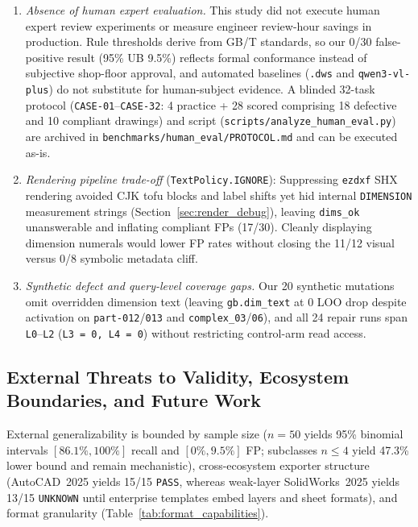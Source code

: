 \documentclass[nocopyright,nolists,upint,varvw,hyphenate]{asmejour}
\begin{document}
\begin{enumerate}
\item \emph{Absence of human expert evaluation.} This study did not execute human expert review experiments or measure engineer review-hour savings in production. Rule thresholds derive from GB/T standards, so our 0/30 false-positive result (95\% UB 9.5\%) reflects formal conformance instead of subjective shop-floor approval, and automated baselines (\texttt{.dws} and \texttt{qwen3-vl-plus}) do not substitute for human-subject evidence. A blinded 32-task protocol (\texttt{CASE-01}--\texttt{CASE-32}: 4 practice + 28 scored comprising 18 defective and 10 compliant drawings) and script (\texttt{scripts/analyze\_human\_eval.py}) are archived in \texttt{benchmarks/human\_eval/PROTOCOL.md} and can be executed as-is.
\item \emph{Rendering pipeline trade-off} (\texttt{TextPolicy.IGNORE}): Suppressing \texttt{ezdxf} SHX rendering avoided CJK tofu blocks and label shifts yet hid internal \texttt{DIMENSION} measurement strings (Section~\ref{sec:render_debug}), leaving \texttt{dims\_ok} unanswerable and inflating compliant FPs (17/30). Cleanly displaying dimension numerals would lower FP rates without closing the 11/12 visual versus 0/8 symbolic metadata cliff.
\item \emph{Synthetic defect and query-level coverage gaps.} Our 20 synthetic mutations omit overridden dimension text (leaving \texttt{gb.dim\_text} at 0 LOO drop despite activation on \texttt{part-012}/\texttt{013} and \texttt{complex\_03}/\texttt{06}), and all 24 repair runs span \texttt{L0}--\texttt{L2} (\texttt{L3 = 0, L4 = 0}) without restricting control-arm read access.
\end{enumerate}

\subsection{External Threats to Validity, Ecosystem Boundaries, and Future Work}\label{sec:external_threats}

External generalizability is bounded by sample size ($n=50$ yields 95\% binomial intervals $[86.1\%, 100\%]$ recall and $[0\%, 9.5\%]$ FP; subclasses $n \le 4$ yield 47.3\% lower bound and remain mechanistic), cross-ecosystem exporter structure (AutoCAD~2025 yields 15/15 \texttt{PASS}, whereas weak-layer SolidWorks~2025 yields 13/15 \texttt{UNKNOWN} until enterprise templates embed layers and sheet formats), and format granularity (Table~\ref{tab:format_capabilities}).
\end{document}
